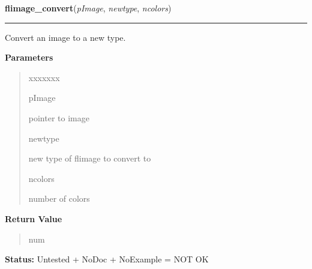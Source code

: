 \hspace{.8\funcindent}\begin{boxedminipage}{\funcwidth}

    \raggedright \textbf{flimage\_convert}(\textit{pImage}, \textit{newtype}, \textit{ncolors})

    \vspace{-1.5ex}

    \rule{\textwidth}{0.5\fboxrule}
\setlength{\parskip}{2ex}
    Convert an image to a new type.

\setlength{\parskip}{1ex}
      \textbf{Parameters}
      \vspace{-1ex}

      \begin{quote}
        \begin{Ventry}{xxxxxxx}

          \item[pImage]

          pointer to image

          \item[newtype]

          new type of flimage to convert to

          \item[ncolors]

          number of colors

        \end{Ventry}

      \end{quote}

      \textbf{Return Value}
    \vspace{-1ex}

      \begin{quote}
      num

      \end{quote}

\textbf{Status:} Untested + NoDoc + NoExample = NOT OK



    \end{boxedminipage}

    \label{xformslib:library:flimage_type_name}

    \vspace{0.5ex}

